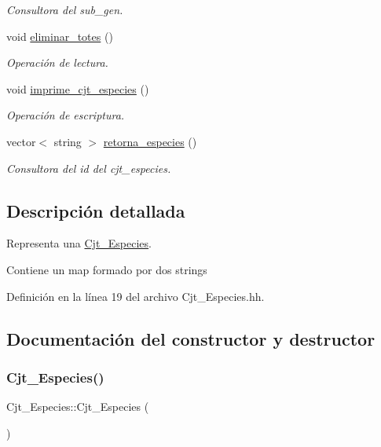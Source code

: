 \begin{DoxyCompactItemize}
\begin{DoxyCompactList}\small\item\em Consultora del sub\+\_\+gen. \end{DoxyCompactList}\item 
void \hyperlink{class_cjt___especies_a341dfedcac85d19e084d68f7611af8f9}{eliminar\+\_\+totes} ()
\begin{DoxyCompactList}\small\item\em Operación de lectura. \end{DoxyCompactList}\item 
void \hyperlink{class_cjt___especies_a61b0168970e926d3a27faf3f31ad2869}{imprime\+\_\+cjt\+\_\+especies} ()
\begin{DoxyCompactList}\small\item\em Operación de escriptura. \end{DoxyCompactList}\item 
vector$<$ string $>$ \hyperlink{class_cjt___especies_aa06bb16bd1733ed2985bb312d3c8d42b}{retorna\+\_\+especies} ()
\begin{DoxyCompactList}\small\item\em Consultora del id del cjt\+\_\+especies. \end{DoxyCompactList}\end{DoxyCompactItemize}


\subsection{Descripción detallada}
Representa una \hyperlink{class_cjt___especies}{Cjt\+\_\+\+Especies}. 

Contiene un map formado por dos strings 

Definición en la línea 19 del archivo Cjt\+\_\+\+Especies.\+hh.



\subsection{Documentación del constructor y destructor}
\mbox{\label{class_cjt___especies_ae423b9d5a456158136c17d9210c90c2e}} 
\subsubsection{\texorpdfstring{Cjt\+\_\+\+Especies()}{Cjt\_Especies()}}
{\footnotesize\ttfamily Cjt\+\_\+\+Especies\+::\+Cjt\+\_\+\+Especies (\begin{DoxyParamCaption}{ }\end{DoxyParamCaption})}



